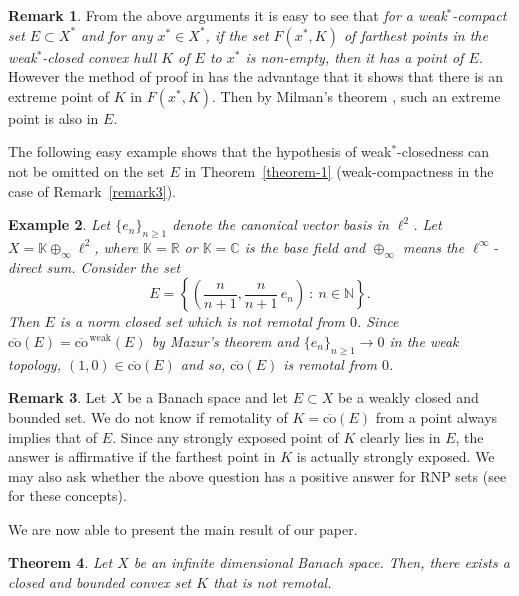 \documentclass[11pt,a4paper]{amsart}
\theoremstyle{plain}
\newtheorem{thm}{Theorem}
\theoremstyle{definition}
\newtheorem{rem}[thm]{Remark}
\newtheorem{ex}[thm]{Example}
\newcommand{\cconv}{\overline{\mathrm{co}}}
\newcommand{\C}{\mathbb{C}}
\newcommand{\K}{\mathbb{K}}
\newcommand{\R}{\ensuremath{\mathbb{R}}}
\newcommand{\N}{\ensuremath{\mathbb{N}}}
\renewcommand{\geq}{\geqslant}
\begin{document}
\begin{rem} From the above arguments it is easy to see that
{\slshape for a weak$^\ast$-compact set $E \subset X^\ast$ and for
any $x^\ast \in X^\ast$, if the set $F(x^\ast,K)$ of farthest
points in the weak$^\ast$-closed convex hull $K$ of $E$ to
$x^\ast$ is non-empty, then it has a point of $E$.\ } However the
method of proof in \cite{R} has the advantage that it shows that
there is an extreme point of $K$ in $F(x^\ast,K)$. Then by
Milman's theorem \cite[p.~151]{D}, such an extreme point is also
in $E$.
\end{rem}

The following easy example shows that the hypothesis of
weak$^\ast$-closedness can not be omitted on the set $E$ in
Theorem~\ref{theorem-1} (weak-compactness in the case of
Remark~\ref{remark3}).

\begin{ex} {\slshape Let $\{e_n\}_{n\geq 1}$ denote the canonical vector basis
in $\ell^2$. Let $X = \K \oplus_{\infty} \ell^2$, where $\K=\R$ or
$\K=\C$ is the base field and $\oplus_\infty$ means the
$\ell^{\infty}$-direct sum. Consider the set
$$
E=\left\{\left(\frac{n}{n+1},\frac{n}{n+1}\,e_n\right)\ : \ n\in\N\right\}.
$$
Then $E$ is a norm closed set which is not remotal from $0$. Since
$\cconv(E)=\cconv^{\,\textrm{weak}}(E)$ by Mazur's theorem and
$\{e_n\}_{n\geq 1}\longrightarrow 0$ in the weak topology, $(1,0)\in
\cconv(E)$ and so, $\cconv(E)$ is  remotal from $0$.}
\end{ex}

\begin{rem} Let $X$ be a Banach space and let $E \subset X$ be
a weakly closed and bounded set. We do not know if remotality of $K
= \cconv(E)$ from a point always implies that of $E$. Since any
strongly exposed point of $K$ clearly lies in $E$, the answer is
affirmative if the farthest point in $K$ is actually strongly
exposed. We may also ask whether the above question has a positive
answer for RNP sets (see \cite[\S~3]{Bourgin} for these concepts).
\end{rem}

We are now able to present the main result of our paper.

\begin{thm}\label{theorem-main}
Let $X$ be an infinite dimensional Banach space. Then, there exists
a closed and bounded convex set $K$ that is not remotal.
\end{thm}
\end{document}
